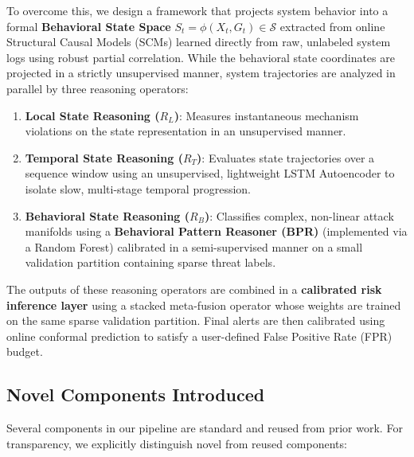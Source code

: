 To overcome this, we design a framework that projects system behavior into a formal \textbf{Behavioral State Space} $S_t = \phi(X_t, G_t) \in \mathcal{S}$ extracted from online Structural Causal Models (SCMs) learned directly from raw, unlabeled system logs using robust partial correlation. While the behavioral state coordinates are projected in a strictly unsupervised manner, system trajectories are analyzed in parallel by three reasoning operators:
\begin{enumerate}
\item \textbf{Local State Reasoning ($R_L$)}: Measures instantaneous mechanism violations on the state representation in an unsupervised manner.
\item \textbf{Temporal State Reasoning ($R_T$)}: Evaluates state trajectories over a sequence window using an unsupervised, lightweight LSTM Autoencoder to isolate slow, multi-stage temporal progression.
\item \textbf{Behavioral State Reasoning ($R_B$)}: Classifies complex, non-linear attack manifolds using a \textbf{Behavioral Pattern Reasoner (BPR)} (implemented via a Random Forest) calibrated in a semi-supervised manner on a small validation partition containing sparse threat labels.
\end{enumerate}

The outputs of these reasoning operators are combined in a \textbf{calibrated risk inference layer} using a stacked meta-fusion operator whose weights are trained on the same sparse validation partition. Final alerts are then calibrated using online conformal prediction to satisfy a user-defined False Positive Rate (FPR) budget.

\subsection{Novel Components Introduced}
\label{sec:novel_components}
Several components in our pipeline are standard and reused from prior work. For transparency, we explicitly distinguish novel from reused components:

